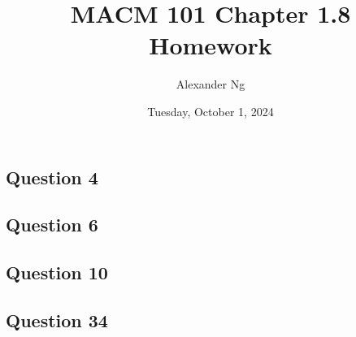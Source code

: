 \documentclass[12pt]{article}
\begin{document}
\title{MACM 101 Chapter 1.8 Homework}
\author{Alexander Ng}
\date{Tuesday, October 1, 2024}

\maketitle

\subsection*{Question 4}
\subsection*{Question 6}
\subsection*{Question 10}
\subsection*{Question 34}
\end{document}
